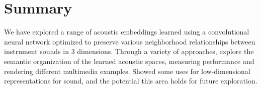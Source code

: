 \documentclass{article}
\begin{document}
\section{Summary}

We have explored a range of acoustic embeddings learned using a convolutional neural network optimized to preserve various neighborhood relationships between instrument sounds in 3 dimensions.
Through a variety of approaches, explore the semantic organization of the learned acoustic spaces, measuring performance and rendering different multimedia examples.
Showed some uses for low-dimensional representations for sound, and the potential this area holds for future exploration.




\end{document}
